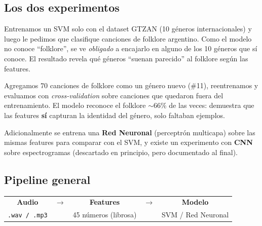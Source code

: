 \documentclass[11pt,a4paper]{article}
\begin{document}
\subsection{Los dos experimentos}

\begin{description}[leftmargin=1.2cm,style=nextline]
  \item[Experimento A --- Folklore \emph{sin} entrenar]
  Entrenamos un SVM solo con el dataset GTZAN (10 géneros internacionales) y
  luego le pedimos que clasifique canciones de folklore argentino. Como el
  modelo no conoce ``folklore'', se ve \emph{obligado} a encajarlo en alguno de
  los 10 géneros que sí conoce. El resultado revela qué géneros ``suenan
  parecido'' al folklore según las features.

  \item[Experimento B --- Folklore \emph{con} entrenamiento]
  Agregamos 70 canciones de folklore como un género nuevo (\#11), reentrenamos
  y evaluamos con \emph{cross-validation} sobre canciones que quedaron fuera del
  entrenamiento. El modelo reconoce el folklore $\sim$66\% de las veces:
  demuestra que las features \textbf{sí} capturan la identidad del género, solo
  faltaban ejemplos.
\end{description}

Adicionalmente se entrena una \textbf{Red Neuronal} (perceptrón multicapa) sobre
las mismas features para comparar con el SVM, y existe un experimento con
\textbf{CNN} sobre espectrogramas (descartado en principio, pero documentado al
final).

\subsection{Pipeline general}

\begin{center}
\begin{tabular}{c c c c c}
\textbf{Audio} & $\rightarrow$ & \textbf{Features} & $\rightarrow$ & \textbf{Modelo} \\
\texttt{.wav / .mp3} & & 45 números (librosa) & & SVM / Red Neuronal \\
\end{tabular}
\end{center}
\end{document}
